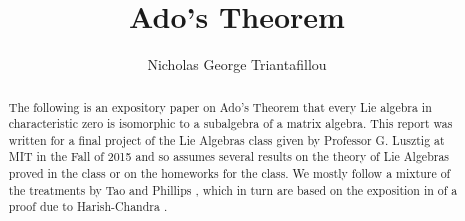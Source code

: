 \documentclass[10pt]{amsart}
\theoremstyle{definition}
\theoremstyle{remark}
\numberwithin{equation}{section}
\begin{document}

\title{Ado's Theorem}


\author{Nicholas George Triantafillou}
\address{Department of Mathematics, Massachusetts Institute of Technology, 
Cambridge, Massachusetts, 02139}





\begin{abstract}
The following is an expository paper on Ado's Theorem that every Lie algebra in characteristic zero is isomorphic to a subalgebra of a matrix algebra. This report was written for a final project of the Lie Algebras class given by Professor G. Lusztig at MIT in the Fall of 2015 and so assumes several results on the theory of Lie Algebras proved in the class or on the homeworks for the class. We mostly follow a mixture of the treatments by Tao \cite{Tao11} and Phillips \cite{Phillips10}, which in turn are based on the exposition in \cite{FultonHarris04} of a proof due to Harish-Chandra \cite{HarishChandra49}.
\end{abstract}


 \maketitle


\end{document}
